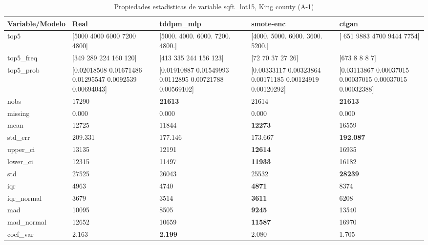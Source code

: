 \begin{table}[H]
\centering
\fontsize{8}{14}\selectfont
\caption{Propiedades  estadisticas de variable sqft\_lot15, King county (A-1)}
\label{table-stats-king county-a-1-sqft_lot15}
\begin{tabular}{|l|m{10em}|m{10em}|m{10em}|m{10em}|}
\hline
 \rowcolor[gray]{0.8}
Variable/Modelo & Real & tddpm\_mlp & smote-enc & ctgan \\
\hline top5 & [5000 4000 6000 7200 4800] & [5000. 4000. 6000. 7200. 4800.] & [4000. 5000. 6000. 3600. 5200.] & [ 651 9883 4700 9444 7754] \\
\hline top5\_freq & [349 289 224 160 120] & [413 335 244 156 123] & [72 70 37 27 26] & [673   8   8   8   7] \\
\hline top5\_prob & [0.02018508 0.01671486 0.01295547 0.0092539  0.00694043] & [0.01910887 0.01549993 0.0112895  0.00721788 0.00569102] & [0.00333117 0.00323864 0.00171185 0.00124919 0.00120292] & [0.03113867 0.00037015 0.00037015 0.00037015 0.00032388] \\
\hline nobs & 17290 & \bfseries 21613 & \cellcolor[rgb]{0.9, 0.54, 0.52} 21614 & \bfseries 21613 \\
\hline missing & 0.000 & 0.000 & 0.000 & 0.000 \\
\hline mean & 12725 & 11844 & \bfseries 12273 & \cellcolor[rgb]{0.9, 0.54, 0.52} 16559 \\
\hline std\_err & 209.331 & 177.146 & \cellcolor[rgb]{0.9, 0.54, 0.52} 173.667 & \bfseries 192.087 \\
\hline upper\_ci & 13135 & 12191 & \bfseries 12614 & \cellcolor[rgb]{0.9, 0.54, 0.52} 16935 \\
\hline lower\_ci & 12315 & 11497 & \bfseries 11933 & \cellcolor[rgb]{0.9, 0.54, 0.52} 16182 \\
\hline std & 27525 & 26043 & \cellcolor[rgb]{0.9, 0.54, 0.52} 25532 & \bfseries 28239 \\
\hline iqr & 4963 & 4740 & \bfseries 4871 & \cellcolor[rgb]{0.9, 0.54, 0.52} 8374 \\
\hline iqr\_normal & 3679 & 3514 & \bfseries 3611 & \cellcolor[rgb]{0.9, 0.54, 0.52} 6208 \\
\hline mad & 10095 & 8505 & \bfseries 9245 & \cellcolor[rgb]{0.9, 0.54, 0.52} 13540 \\
\hline mad\_normal & 12652 & 10659 & \bfseries 11587 & \cellcolor[rgb]{0.9, 0.54, 0.52} 16970 \\
\hline coef\_var & 2.163 & \bfseries 2.199 & 2.080 & \cellcolor[rgb]{0.9, 0.54, 0.52} 1.705 \\

\end{tabular}
\end{table}
